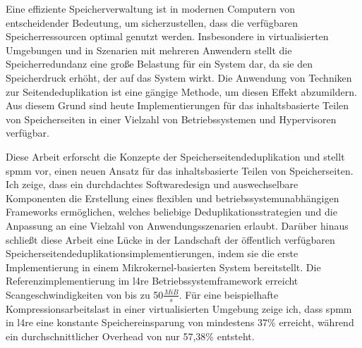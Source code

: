 Eine effiziente Speicherverwaltung ist in modernen Computern von entscheidender Bedeutung, um sicherzustellen, dass die verfügbaren Speicherressourcen optimal genutzt werden.
Insbesondere in virtualisierten Umgebungen und in Szenarien mit mehreren Anwendern stellt die Speicherredundanz eine große Belastung für ein System dar, da sie den Speicherdruck erhöht, der auf das System wirkt.
Die Anwendung von Techniken zur Seitendeduplikation ist eine gängige Methode, um diesen Effekt abzumildern.
Aus diesem Grund sind heute Implementierungen für das inhaltsbasierte Teilen von Speicherseiten in einer Vielzahl von Betriebssystemen und Hypervisoren verfügbar.

Diese Arbeit erforscht die Konzepte der Speicherseitendeduplikation und stellt \acs{spmm} vor, einen neuen Ansatz für das inhaltsbasierte Teilen von Speicherseiten.
Ich zeige, dass ein durchdachtes Softwaredesign und auswechselbare Komponenten die Erstellung eines flexiblen und betriebssystemunabhängigen Frameworks ermöglichen, welches beliebige Deduplikationsstrategien und die Anpassung an eine Vielzahl von Anwendungsszenarien erlaubt.
Darüber hinaus schließt diese Arbeit eine Lücke in der Landschaft der öffentlich verfügbaren Speicherseitendeduplikationsimplementierungen, indem sie die erste Implementierung in einem Mikrokernel-basierten System bereitstellt.
Die Referenzimplementierung im \acs{l4re} Betriebssystemframework erreicht Scangeschwindigkeiten von bis zu 50$\frac{MiB}{s}$.
Für eine beispielhafte Kompressionsarbeitslast in einer virtualisierten Umgebung zeige ich, dass \acs{spmm} in \acs{l4re} eine konstante Speichereinsparung von mindestens 37\% erreicht, während ein durchschnittlicher Overhead von nur 57,38\% entsteht.
